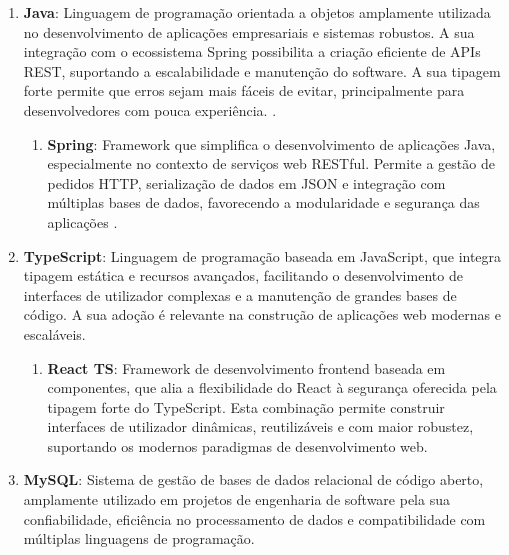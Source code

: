 \begin{enumerate}
    \item \textbf{Java}: Linguagem de programação orientada a objetos amplamente utilizada no desenvolvimento de aplicações empresariais e sistemas robustos. A sua integração com o ecossistema Spring possibilita a criação eficiente de APIs REST, suportando a escalabilidade e manutenção do software. A sua tipagem forte permite que erros sejam mais fáceis de evitar, principalmente para desenvolvedores com pouca experiência.  \cite{spring-rest-intro,geeksforgeeks-rest,spring-guides}.
        \begin{enumerate}
            \item \textbf{Spring}: Framework que simplifica o desenvolvimento de aplicações Java, especialmente no contexto de serviços web RESTful. Permite a gestão de pedidos HTTP, serialização de dados em JSON e integração com múltiplas bases de dados, favorecendo a modularidade e segurança das aplicações \cite{spring-rest-intro,geeksforgeeks-rest,spring-guides}.
        \end{enumerate}
    \item \textbf{TypeScript}: Linguagem de programação baseada em JavaScript, que integra tipagem estática e recursos avançados, facilitando o desenvolvimento de interfaces de utilizador complexas e a manutenção de grandes bases de código. A sua adoção é relevante na construção de aplicações web modernas e escaláveis.
    \begin{enumerate}
        \item \textbf{React TS}: Framework de desenvolvimento frontend baseada em componentes, que alia a flexibilidade do React à segurança oferecida pela tipagem forte do TypeScript. Esta combinação permite construir interfaces de utilizador dinâmicas, reutilizáveis e com maior robustez, suportando os modernos paradigmas de desenvolvimento web.
    \end{enumerate}
    \item \textbf{MySQL}: Sistema de gestão de bases de dados relacional de código aberto, amplamente utilizado em projetos de engenharia de software pela sua confiabilidade, eficiência no processamento de dados e compatibilidade com múltiplas linguagens de programação.
\end{enumerate}



